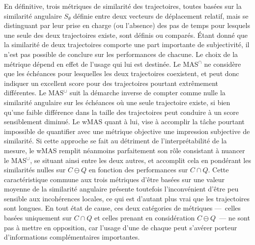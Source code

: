 \documentclass[../main.tex]{subfiles}
\begin{document}
En définitive, trois métriques de similarité des trajectoires, toutes basées sur la similarité angulaire $S_\theta$ définie entre deux vecteurs de déplacement
relatif, mais se distinguant par leur prise en charge (ou l'absence) des pas de temps pour lesquels une seule des deux trajectoires existe, sont définis ou
comparés. Étant donné que la similarité de deux trajectoires comporte une part importante de subjectivité, il n'est pas possible de conclure sur les
performances de chacune. Le choix de la métrique dépend en effet de l'usage qui lui est destinée. Le MAS$^\cap$ ne considère que les échéances pour lesquelles
les deux trajectoires coexistent, et peut donc indiquer un excellent score pour des trajectoires pourtant extrêmement différentes. Le MAS$^\cup$ suit la
démarche inverse de compter comme nulle la similarité angulaire sur les échéances où une seule trajectoire existe, si bien qu'une faible différence dans la
taille des trajectoires peut conduire à un score sensiblement diminué. Le wMAS quant à lui, vise à accomplir la tâche pourtant impossible de quantifier avec une
métrique objective une impression subjective de similarité. Si cette approche se fait au détriment de l'interprétabilité de la mesure, le wMAS remplit néanmoins
parfaitement son rôle consistant à nuancer le MAS$^\cup$, se situant ainsi entre les deux autres, et accomplit cela en pondérant les similarités nulles sur $C
\ominus Q$ en fonction des performances sur $C \cap Q$. Cette caractéristique commune aux trois métriques d'être basées sur une valeur moyenne de la similarité
angulaire présente toutefois l'inconvénient d'être peu sensible aux incohérences locales, ce qui est d'autant plus vrai que les trajectoires sont longues. En
tout état de cause, ces deux catégories de métriques ---~celles basées uniquement sur $C \cap Q$ et celles prenant en considération $C \ominus Q$~--- ne sont
pas à mettre en opposition, car l'usage d'une de chaque peut s'avérer porteur d'informations complémentaires importantes.
\end{document}
